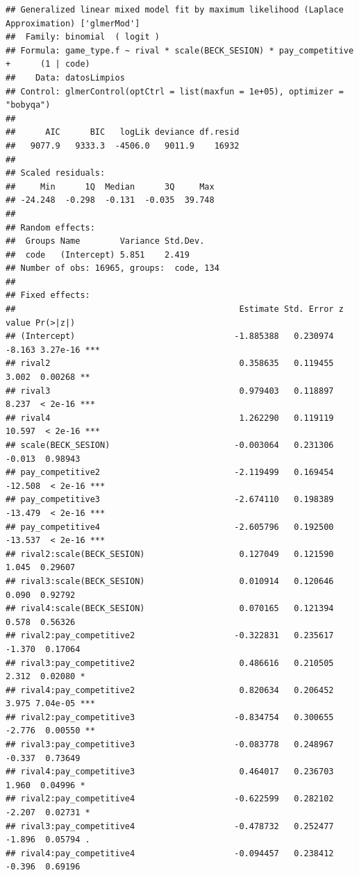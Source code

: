 \documentclass[
]{article}
\begin{document}
\begin{verbatim}
## Generalized linear mixed model fit by maximum likelihood (Laplace Approximation) ['glmerMod']
##  Family: binomial  ( logit )
## Formula: game_type.f ~ rival * scale(BECK_SESION) * pay_competitive +      (1 | code)
##    Data: datosLimpios
## Control: glmerControl(optCtrl = list(maxfun = 1e+05), optimizer = "bobyqa")
## 
##      AIC      BIC   logLik deviance df.resid 
##   9077.9   9333.3  -4506.0   9011.9    16932 
## 
## Scaled residuals: 
##     Min      1Q  Median      3Q     Max 
## -24.248  -0.298  -0.131  -0.035  39.748 
## 
## Random effects:
##  Groups Name        Variance Std.Dev.
##  code   (Intercept) 5.851    2.419   
## Number of obs: 16965, groups:  code, 134
## 
## Fixed effects:
##                                             Estimate Std. Error z value Pr(>|z|)    
## (Intercept)                                -1.885388   0.230974  -8.163 3.27e-16 ***
## rival2                                      0.358635   0.119455   3.002  0.00268 ** 
## rival3                                      0.979403   0.118897   8.237  < 2e-16 ***
## rival4                                      1.262290   0.119119  10.597  < 2e-16 ***
## scale(BECK_SESION)                         -0.003064   0.231306  -0.013  0.98943    
## pay_competitive2                           -2.119499   0.169454 -12.508  < 2e-16 ***
## pay_competitive3                           -2.674110   0.198389 -13.479  < 2e-16 ***
## pay_competitive4                           -2.605796   0.192500 -13.537  < 2e-16 ***
## rival2:scale(BECK_SESION)                   0.127049   0.121590   1.045  0.29607    
## rival3:scale(BECK_SESION)                   0.010914   0.120646   0.090  0.92792    
## rival4:scale(BECK_SESION)                   0.070165   0.121394   0.578  0.56326    
## rival2:pay_competitive2                    -0.322831   0.235617  -1.370  0.17064    
## rival3:pay_competitive2                     0.486616   0.210505   2.312  0.02080 *  
## rival4:pay_competitive2                     0.820634   0.206452   3.975 7.04e-05 ***
## rival2:pay_competitive3                    -0.834754   0.300655  -2.776  0.00550 ** 
## rival3:pay_competitive3                    -0.083778   0.248967  -0.337  0.73649    
## rival4:pay_competitive3                     0.464017   0.236703   1.960  0.04996 *  
## rival2:pay_competitive4                    -0.622599   0.282102  -2.207  0.02731 *  
## rival3:pay_competitive4                    -0.478732   0.252477  -1.896  0.05794 .  
## rival4:pay_competitive4                    -0.094457   0.238412  -0.396  0.69196    

\end{verbatim}
\end{document}
